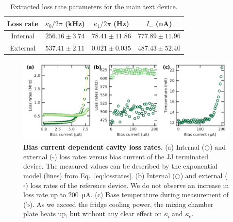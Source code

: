 \begin{table}
	\caption{Extracted loss rate parameters for the main text device.\label{tab:lossrates}}
	\begin{tabular}{cccc}
		\hline \hline
		Loss rate         & $\kappa_0/2\pi$ (\si{\kilo\hertz}) & $\kappa_1/2\pi$ (\si{\hertz}) & $I_{\sim}$ (\si{\nano\ampere}) \\
		\hline
		Internal & $256.16 \pm 3.74$             & $78.41 \pm 11.86$      & $777.89 \pm 11.96$             \\
		External & $537.41 \pm 2.11$             & $0.021 \pm 0.035$      & $487.43 \pm 52.40	$             \\
		\hline \hline
	\end{tabular}
\end{table}

\begin{figure}
	\centering
	\includegraphics[width=\linewidth]{chapter-currentdetection/figures/SM_lossrates}
	\caption{
		\textbf{Bias current dependent cavity loss rates.}
		(a) Internal ($\bigcirc$) and external ($\square$) loss rates versus bias current of the JJ terminated device. The measured values can be described by the exponential model (lines) from Eq.~\eqref{eq:lossrates}.
		(b) Internal ($\bigcirc$) and external ($\square$) loss rates of the reference device.
		We do not observe an increase in loss rate up to \SI{200}{\micro\ampere}.
		(c) Base temperature during measurement of (b).
		As we exceed the fridge cooling power, the mixing chamber plate heats up, but without any clear effect on $\kappa_\text{i}$ and $\kappa_\text{e}$.
	}
	\label{fig:lossratesvscurrent}
\end{figure}

